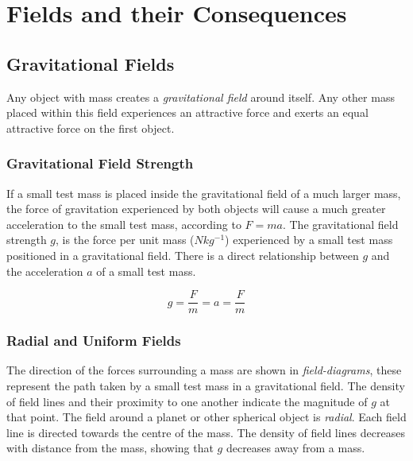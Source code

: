 \documentclass[12pt]{article}
\begin{document}
\section{Fields and their Consequences}
\label{sec:orgdcc77a6}
\subsection{Gravitational Fields}
\label{sec:orgca4260e}

Any object with mass creates a \emph{gravitational field} around itself. Any other mass placed within this field experiences an attractive force and exerts an equal attractive force on the first object.

\subsubsection{Gravitational Field Strength}
\label{sec:org158d28d}

If a small test mass is placed inside the gravitational field of a much larger mass, the force of gravitation experienced by both objects will cause a much greater acceleration to the small test mass, according to \(F = ma\). The gravitational field strength \(g\), is the force per unit mass (\(Nkg^{-1}\)) experienced by a small test mass positioned in a gravitational field. There is a direct relationship between \(g\) and the acceleration \(a\) of a small test mass.

\[g = \dfrac{F}{m} = a = \dfrac{F}{m}\]

\subsubsection{Radial and Uniform Fields}
\label{sec:orge8a6284}

The direction of the forces surrounding a mass are shown in \emph{field-diagrams}, these represent the path taken by a small test mass in a gravitational field. The density of field lines and their proximity to one another indicate the magnitude of \(g\) at that point. The field around a planet or other spherical object is \emph{radial}. Each field line is directed towards the centre of the mass. The density of field lines decreases with distance from the mass, showing that \(g\) decreases away from a mass.
\end{document}
